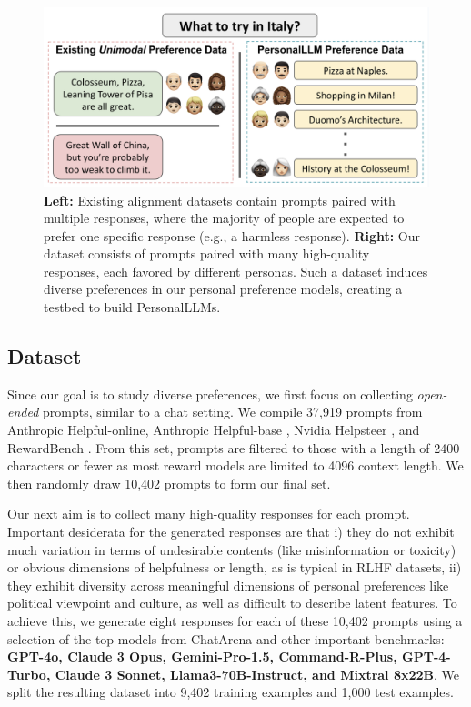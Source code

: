 \begin{figure}[t]
    \centering
    \includegraphics[width = \textwidth]{figures/data_example.png}
    \caption{\textbf{Left:} Existing alignment datasets contain prompts paired with multiple responses, where the majority of people are expected to prefer one specific response (e.g., a harmless response). \textbf{Right:} Our dataset consists of prompts paired with many high-quality responses, each favored by different personas. Such a dataset induces diverse preferences in our personal preference models, creating a testbed to build \textsf{PersonalLLM}s.}
    \label{fig:PersonalLLM}
\end{figure}

\subsection{Dataset}

Since our goal is to study diverse preferences, we first focus on collecting \textit{open-ended} prompts, similar to a chat setting.
We compile 37,919 prompts from Anthropic Helpful-online, Anthropic Helpful-base \citep{bai2022training}, Nvidia Helpsteer \citep{wang2023helpsteermultiattributehelpfulnessdataset}, and RewardBench \citep{lambert2024rewardbench}.
From this set, prompts are filtered to those with a length of 2400 characters or fewer as most reward models are limited to 4096 context length. We then randomly draw 10,402 prompts to form our final set.

Our next aim is to collect many high-quality responses for each prompt. 
Important desiderata for the generated responses are that i) they do not exhibit much variation in terms of undesirable contents (like misinformation or toxicity) or obvious dimensions of helpfulness or length, as is typical in RLHF datasets, ii) they exhibit diversity across meaningful dimensions of personal preferences like political viewpoint and culture, as well as difficult to describe latent features.
To achieve this, we generate eight responses for each of these 10,402 prompts using a selection of the top models from ChatArena and other important benchmarks: \textbf{ GPT-4o, Claude 3 Opus, Gemini-Pro-1.5, Command-R-Plus, GPT-4-Turbo, Claude 3 Sonnet, Llama3-70B-Instruct, and Mixtral 8x22B}. We split the resulting dataset into 9,402 training examples and 1,000 test examples. 

